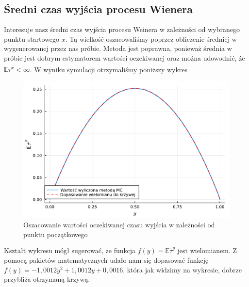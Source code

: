\documentclass[12pt]{mwart}
\begin{document}
	
	\subsection{Średni czas wyjścia procesu Wienera}
	\noindent Interesuje nasz średni czas wyjścia procesu Weinera w zależności od wybranego punktu startowego $x$. Tą wielkość oszacowaliśmy poprzez obliczenie średniej w wygenerowanej przez nas próbie. Metoda jest poprawna, ponieważ średnia w próbie jest dobrym estymatorem wartości oczekiwanej oraz można udowodnić, że $\mathbb{E}\tau^x<\infty$\textsuperscript{\cite{art}}. W wyniku symulacji otrzymaliśmy poniższy wykres
	\begin{figure}[H]
		\includegraphics[width=\columnwidth]{fig/plot/expect_val.pdf}
		\caption{Oszacowanie wartości oczekiwanej czasu wyjścia w zależności od punktu początkowego}
	\end{figure}
	\noindent Kształt wykresu mógł sugerować, że funkcja $f(y)=\mathbb{E}\widetilde\tau^y$ jest wielomianem. Z pomocą pakietów matematycznych udało nam się dopasować funkcję $f(y)=-1,0012y^2+1,0012y+0,0016$, która jak widzimy na wykresie, dobrze przybliża otrzymaną krzywą.\vspace{1.5mm}\\
\end{document}
